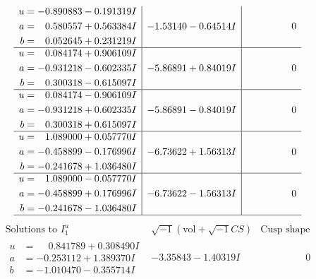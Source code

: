 \documentclass[1p]{elsarticle_modified}
\theoremstyle{definition}
\newcommand{\I}{\sqrt{-1}}
\begin{document}
$$\begin{array}{c|c|c}
\begin{aligned}
u &= -0.890883 - 0.191319 I \\
a &= \phantom{-}0.580557 + 0.563384 I \\
b &= \phantom{-}0.052645 + 0.231219 I\end{aligned}
 & -1.53140 - 0.64514 I & \phantom{-0.000000 } 0 \\ \hline\begin{aligned}
u &= \phantom{-}0.084174 + 0.906109 I \\
a &= -0.931218 - 0.602335 I \\
b &= \phantom{-}0.300318 - 0.615097 I\end{aligned}
 & -5.86891 + 0.84019 I & \phantom{-0.000000 } 0 \\ \hline\begin{aligned}
u &= \phantom{-}0.084174 - 0.906109 I \\
a &= -0.931218 + 0.602335 I \\
b &= \phantom{-}0.300318 + 0.615097 I\end{aligned}
 & -5.86891 - 0.84019 I & \phantom{-0.000000 } 0 \\ \hline\begin{aligned}
u &= \phantom{-}1.089000 + 0.057770 I \\
a &= -0.458899 - 0.176996 I \\
b &= -0.241678 + 1.036480 I\end{aligned}
 & -6.73622 + 1.56313 I & \phantom{-0.000000 } 0 \\ \hline\begin{aligned}
u &= \phantom{-}1.089000 - 0.057770 I \\
a &= -0.458899 + 0.176996 I \\
b &= -0.241678 - 1.036480 I\end{aligned}
 & -6.73622 - 1.56313 I & \phantom{-0.000000 } 0\\
 \hline 
 \end{array}$$\newpage$$\begin{array}{c|c|c}  
\text{Solutions to }I^u_{1}& \I (\text{vol} + \sqrt{-1}CS) & \text{Cusp shape}\\
 \hline 
\begin{aligned}
u &= \phantom{-}0.841789 + 0.308490 I \\
a &= -0.253112 + 1.389370 I \\
b &= -1.010470 - 0.355714 I\end{aligned}
 & -3.35843 - 1.40319 I & \phantom{-0.000000 } 0 \\ \hline\begin{aligned}

\end{aligned}
\end{array}$$
\end{document}
